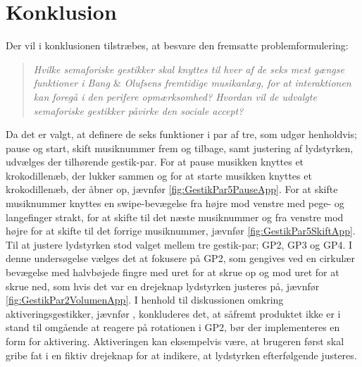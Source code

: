 \chapter{Konklusion}
\label{Konklusion}
%
Der vil i konklusionen tilstræbes, at besvare den fremsatte problemformulering: 
%
\begin{quotation}
	\noindent
	\textit{Hvilke semaforiske gestikker skal knyttes til hver af de seks mest gængse funktioner i Bang $\&$ Olufsens fremtidige musikanlæg, for at interaktionen kan foregå i den perifere opmærksomhed?\blankline
		Hvordan vil de udvalgte semaforiske gestikker påvirke den sociale accept?}\blankline
\end{quotation}
%
Da det er valgt, at definere de seks funktioner i par af tre, som udgør henholdvis; pause og start, skift musiknummer frem og tilbage, samt justering af lydstyrken, udvælges der tilhørende gestik-par. For at pause musikken knyttes et krokodillenæb, der lukker sammen og for at starte musikken knyttes et krokodillenæb, der åbner op, jævnfør \autoref{fig:GestikPar5PauseApp}. For at skifte musiknummer knyttes en swipe-bevægelse fra højre mod venstre med pege- og langefinger strakt, for at skifte til det næste musiknummer og fra venstre mod højre for at skifte til det forrige musiknummer, jævnfør \autoref{fig:GestikPar5SkiftApp}. Til at justere lydstyrken stod valget mellem tre gestik-par; GP2, GP3 og GP4. I denne undersøgelse vælges det at fokusere på GP2, som gengives ved en cirkulær bevægelse med halvbøjede fingre med uret for at skrue op og mod uret for at skrue ned, som hvis det var en drejeknap lydstyrken justeres på, jævnfør \autoref{fig:GestikPar2VolumenApp}. I henhold til diskussionen omkring aktiveringsgestikker, jævnfør , konkluderes det, at såfremt produktet ikke er i stand til omgående at reagere på rotationen i GP2, bør der implementeres en form for aktivering. Aktiveringen kan eksempelvis være, at brugeren først skal gribe fat i en fiktiv drejeknap for at indikere, at lydstyrken efterfølgende justeres.

